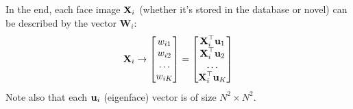 \documentclass[a4paper]{article}
\begin{document}
In the end, each face image $\textbf{X}_i$ (whether it's stored in the database or novel) can be described by the vector $\textbf{W}_i$:
\[
	\textbf{X}_i \rightarrow 
	\begin{bmatrix}
		w_{i1}\\
		w_{i2}\\
		\ldots\\
		w_{iK}\\
	\end{bmatrix} = 
	\begin{bmatrix}
		\textbf{X}_i ^{\top} \textbf{u}_1\\
		\textbf{X}_i ^{\top} \textbf{u}_2\\
		\ldots\\
		\textbf{X}_i ^{\top} \textbf{u}_K\\
	\end{bmatrix}
\]
Note also that each $\textbf{u}_i$ (eigenface) vector is of size $N^2\times N^2$.
\end{document}
